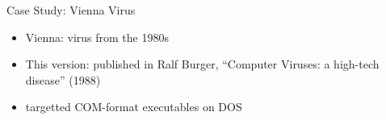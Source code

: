 
\begin{frame}{Case Study: Vienna Virus}
\begin{itemize}
    \item Vienna: virus from the 1980s
    \item This version: published in Ralf Burger, ``Computer Viruses: a high-tech disease'' (1988)
    \item targetted COM-format executables on DOS
\end{itemize}
\end{frame}



